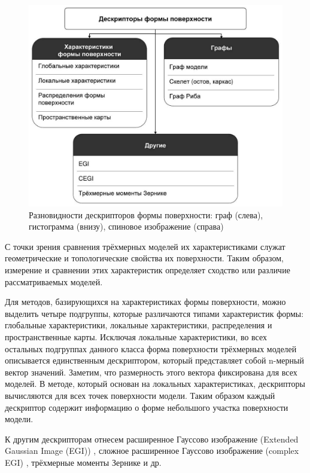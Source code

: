 \documentclass[14pt]{article}
\numberwithin{figure}{section}
\numberwithin{equation}{section}
\begin{document}
\begin{figure}[h]
	\begin{center}
		\includegraphics[scale=0.46]{1.JPG}
		\caption{Разновидности дескрипторов формы поверхности: граф (слева), гистограмма (внизу), спиновое изображение (справа)}
		\label{ris:1}
	\end{center}
\end{figure}

С точки зрения сравнения трёхмерных моделей их характеристиками служат геометрические и топологические свойства их поверхности. Таким образом, измерение и сравнении этих характеристик определяет сходство или различие рассматриваемых моделей.

Для методов, базирующихся на характеристиках формы поверхности, можно выделить четыре подгруппы, которые различаются типами характеристик формы: глобальные характеристики, локальные характеристики, распределения и пространственные карты. Исключая локальные характеристики, во всех остальных подгруппах данного класса форма поверхности трёхмерных моделей описывается единственным дескриптором, который представляет собой n-мерный вектор значений. Заметим, что размерность этого вектора фиксирована для всех моделей. В методе, который основан на локальных характеристиках, дескрипторы вычисляются для всех точек поверхности модели. Таким образом каждый дескриптор содержит информацию о форме небольшого участка поверхности модели.

К другим дескрипторам отнесем расширенное Гауссово изображение (Extended Gaussian Image (EGI)) \cite{Horn}, сложное расширенное Гауссово изображение (complex EGI) \cite{Kang}, трёхмерные моменты Зернике \cite{Novotni} и др.
\end{document}
